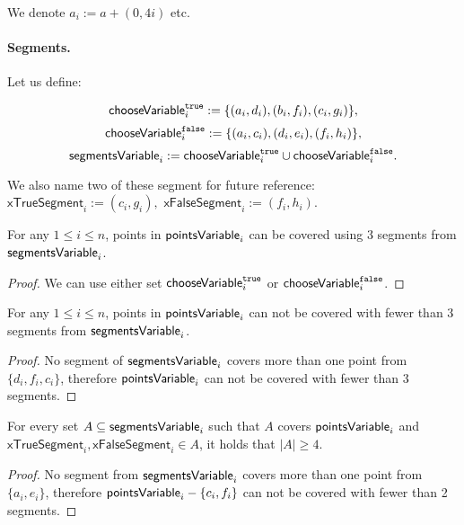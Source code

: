 We denote $a_i := a + (0,4i)$ etc.

\paragraph{Segments.}

\newcommand{\xTrueSegmentDef}[1]{(c_{#1}, g_{#1})}
\newcommand{\xFalseSegmentDef}[1]{(f_{#1}, h_{#1})}
\newcommand{\xTrueSegment}[1]{\mathsf{xTrueSegment}_{#1}}
\newcommand{\xFalseSegment}[1]{\mathsf{xFalseSegment}_{#1}}
\newcommand{\orTrueSegment}[2]{(t_{#1, #2}, v_{#1, #2})}

Let us define:

$$\mathsf{chooseVariable}^{\texttt{true}}_{i} :=\{ (a_i, d_i), (b_i, f_i), (c_i, g_i)\},$$
$$\mathsf{chooseVariable}^{\texttt{false}}_{i} := \{(a_i, c_i), (d_i, e_i), (f_i, h_i)\},$$
$$\mathsf{segmentsVariable}_{i} := \mathsf{chooseVariable}^{\texttt{true}}_{i} \cup \mathsf{chooseVariable}^{\texttt{false}}_{i}.$$

We also name two of these segment for future reference:
$\xTrueSegment{i} := \xTrueSegmentDef{i},$
$\xFalseSegment{i} := \xFalseSegmentDef{i}.$

\begin{lemma}
\label{choose_variables_solution}
For any $1 \le i \le n$, points in $\mathsf{pointsVariable}_{i}$
can be covered using 3 segments from $\mathsf{segmentsVariable}_{i}$.
\end{lemma}

\begin{proof}
We can use either set $\mathsf{chooseVariable}^{\texttt{true}}_{i}$ or $\mathsf{chooseVariable}^{\texttt{false}}_{i}$.
\end{proof}

\begin{lemma}
\label{choose_variables_no_less}
For any $1 \le i \le n$, points in $\mathsf{pointsVariable}_{i}$
can not be covered with fewer than 3 segments from $\mathsf{segmentsVariable}_{i}$.
\end{lemma}

\begin{proof}
No segment of $\mathsf{segmentsVariable}_{i}$ covers more than one point from
$\{d_i, f_i, c_i\}$, therefore $\mathsf{pointsVariable}_{i}$ can
not be covered with fewer than 3 segments.
\end{proof}

\begin{lemma}
\label{choose_variables_both}
For every set $A \subseteq \mathsf{segmentsVariable}_{i}$ such that $A$ covers $\mathsf{pointsVariable}_{i}$
and $\xTrueSegment{i}, \xFalseSegment{i} \in A$,
it holds that $|A| \ge 4$.
\end{lemma}
\begin{proof}
No segment from $\mathsf{segmentsVariable}_{i}$ covers more than one point from
$\{a_i, e_i\}$,
therefore 
$\mathsf{pointsVariable}_{i} - \{c_i, f_i\}$
can not be covered with fewer than 2 segments.
\end{proof}


